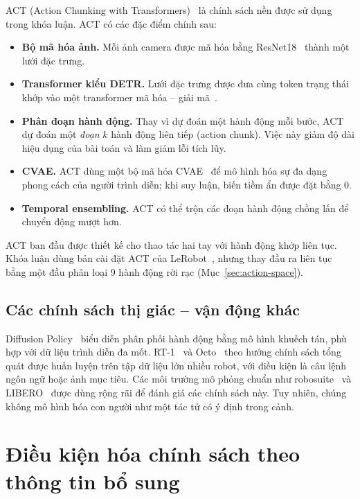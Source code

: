 ACT (Action Chunking with Transformers)~\cite{zhao2023act} là chính sách nền được sử dụng trong khóa luận. ACT có các đặc điểm chính sau:
\begin{itemize}
  \item \textbf{Bộ mã hóa ảnh.} Mỗi ảnh camera được mã hóa bằng ResNet18~\cite{he2016resnet} thành một lưới đặc trưng.
  \item \textbf{Transformer kiểu DETR.} Lưới đặc trưng được đưa cùng token trạng thái khớp vào một transformer mã hóa -- giải mã~\cite{vaswani2017attention,carion2020detr}.
  \item \textbf{Phân đoạn hành động.} Thay vì dự đoán một hành động mỗi bước, ACT dự đoán một \emph{đoạn} $k$ hành động liên tiếp (action chunk). Việc này giảm độ dài hiệu dụng của bài toán và làm giảm lỗi tích lũy.
  \item \textbf{CVAE.} ACT dùng một bộ mã hóa CVAE~\cite{sohn2015cvae} để mô hình hóa sự đa dạng phong cách của người trình diễn; khi suy luận, biến tiềm ẩn được đặt bằng 0.
  \item \textbf{Temporal ensembling.} ACT có thể trộn các đoạn hành động chồng lấn để chuyển động mượt hơn.
\end{itemize}

ACT ban đầu được thiết kế cho thao tác hai tay với hành động khớp liên tục. Khóa luận dùng bản cài đặt ACT của LeRobot~\cite{cadene2026lerobot}, nhưng thay đầu ra liên tục bằng một đầu phân loại 9 hành động rời rạc (Mục~\ref{sec:action-space}).

\subsection{Các chính sách thị giác -- vận động khác}

Diffusion Policy~\cite{chi2023diffusion} biểu diễn phân phối hành động bằng mô hình khuếch tán, phù hợp với dữ liệu trình diễn đa mốt. RT-1~\cite{brohan2023rt1} và Octo~\cite{octo2024} theo hướng chính sách tổng quát được huấn luyện trên tập dữ liệu lớn nhiều robot, với điều kiện là câu lệnh ngôn ngữ hoặc ảnh mục tiêu. Các môi trường mô phỏng chuẩn như robosuite~\cite{zhu2020robosuite} và LIBERO~\cite{liu2023libero} được dùng rộng rãi để đánh giá các chính sách này. Tuy nhiên, chúng không mô hình hóa con người như một tác tử có ý định trong cảnh.

\section{Điều kiện hóa chính sách theo thông tin bổ sung}
\label{sec:related-conditioning}

